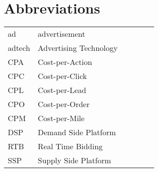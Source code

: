\chapter*{Abbreviations}

\begin{flushleft}
\begin{tabular}{l p{0.8\linewidth}}
ad    & advertisement\\
adtech   & Advertising Technology\\
CPA   & Cost-per-Action\\
CPC   & Cost-per-Click\\
CPL   & Cost-per-Lead\\
CPO   & Cost-per-Order\\
CPM   & Cost-per-Mile\\
DSP   & Demand Side Platform\\
RTB   & Real Time Bidding\\
SSP   & Supply Side Platform\\
\end{tabular}
\end{flushleft}

